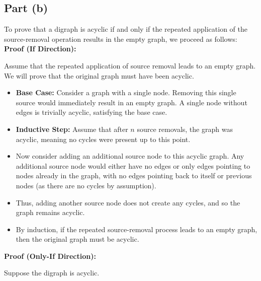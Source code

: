 \documentclass{article}
\begin{document}
\subsection*{Part (b)}

To prove that a digraph is acyclic if and only if the repeated application of the source-removal operation results in the empty graph, we proceed as follows: \\

\textbf{Proof (If Direction):} 

Assume that the repeated application of source removal leads to an empty graph. We will prove that the original graph must have been acyclic.

\begin{itemize}
    \item \textbf{Base Case:} Consider a graph with a single node. Removing this single source would immediately result in an empty graph. A single node without edges is trivially acyclic, satisfying the base case.
    \item \textbf{Inductive Step:} Assume that after \( n \) source removals, the graph was acyclic, meaning no cycles were present up to this point.
    
    \item Now consider adding an additional source node to this acyclic graph. Any additional source node would either have no edges or only edges pointing to nodes already in the graph, with no edges pointing back to itself or previous nodes (as there are no cycles by assumption).
    \item Thus, adding another source node does not create any cycles, and so the graph remains acyclic.
    \item By induction, if the repeated source-removal process leads to an empty graph, then the original graph must be acyclic.
\end{itemize}

\textbf{Proof (Only-If Direction):} 

Suppose the digraph is acyclic. 
\end{document}
